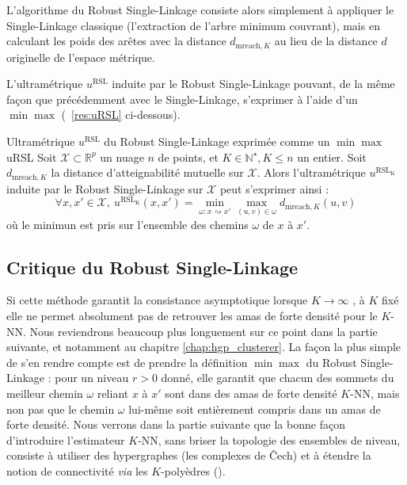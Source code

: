 L'algorithme du {Robust Single-Linkage} consiste alors simplement à appliquer le Single-Linkage classique (l'extraction de l'arbre minimum couvrant), mais en calculant les poids des arêtes avec la distance $d_{\mathrm{mreach}, K}$ au lieu de la distance $d$ originelle de l'espace métrique. 

L'ultramétrique $u^{\mathrm{RSL}}$ induite par le Robust Single-Linkage pouvant, de la même façon que précédemment avec le Single-Linkage, s'exprimer à l'aide d'un $\min \max$ \cite{Draganov2025} (\Res~\ref{res:uRSL} ci-dessous).

\begin{Resultat}{Ultramétrique $u^{\mathrm{RSL}}$ du Robust Single-Linkage exprimée comme un $\min \max$ \cite{Draganov2025}}{uRSL}
Soit $\mathcal X \subset \mathbb R^p$ un nuage $n$ de points, et $K \in \mathbb N^\star, K\le n$ un entier. Soit $d_{\mathrm{mreach}, K}$ la distance d'atteignabilité mutuelle sur $\mathcal X$. Alors l'ultramétrique $u^{\mathrm{RSL_K}}$ induite par le Robust Single-Linkage sur $\mathcal X$ peut s'exprimer ainsi :
\[
\boxed{
    \forall x,x' \in \mathcal X, \ u^{\mathrm{RSL_K}}(x,x') = \min_{\omega : x \rightsquigarrow x'} \max_{(u, v) \in \omega} d_{\mathrm{mreach}, K}(u,v)
    }
    \]
où le minimun est pris sur l'ensemble des chemins $\omega$ de $x$ à $x'$.
\end{Resultat}



\subsection{Critique du Robust Single-Linkage} 
Si cette méthode garantit la consistance asymptotique lorsque $K \to \infty$ \cite{RobustSingleLinkage2010}, à $K$ fixé elle ne permet absolument pas de retrouver les amas de forte densité pour le $K$-NN.
Nous reviendrons beaucoup plus longuement sur ce point dans la partie suivante, et notamment au chapitre \ref{chap:hgp_clusterer}. La façon la plus simple de s'en rendre compte est de prendre la définition $\min \max$ du Robust Single-Linkage : pour un niveau $r>0$ donné, elle garantit que chacun des sommets du meilleur chemin $\omega$ reliant $x$ à $x'$ sont dans des amas de forte densité $K$-NN, mais non pas que le chemin $\omega$ lui-même soit entièrement compris dans un amas de forte densité.
Nous verrons dans la partie suivante que la bonne façon d'introduire l'estimateur $K$-NN, sans briser la topologie des ensembles de niveau, consiste à utiliser des hypergraphes (les complexes de \v{C}ech) et à étendre la notion de connectivité \emph{via} les $K$-polyèdres ().





